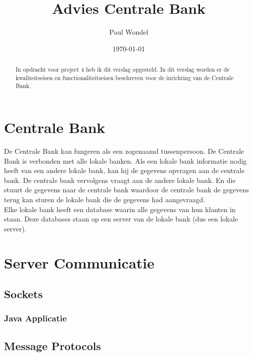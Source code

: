 \documentclass{article}
\begin{document}
\title{Advies Centrale Bank}
\author{Paul Wondel}
\date{\today}
\maketitle

\begin{abstract}
In opdracht voor project 4 heb ik dit verslag opgesteld.
In dit verslag worden er de kwaliteitseisen en functionaliteitseisen
beschreven voor de inrichting van de Centrale Bank.
\end{abstract}

\clearpage
\newpage

\tableofcontents

\clearpage
\newpage

\section{Centrale Bank}
De Centrale Bank kan fungeren als een zogenaamd tussenpersoon.
De Centrale Bank is verbonden met alle lokale banken.
Als een lokale bank informatie nodig heeft van een andere lokale bank,
kan hij de gegevens opvragen aan de centrale bank.
De centrale bank vervolgens vraagt aan de andere lokale bank.
En die stuurt de gegevens naar de centrale bank waardoor de centrale bank
de gegevens terug kan sturen de lokale bank die de gegevens had aangevraagd.\\

Elke lokale bank heeft een database waarin alle gegevens van hun klanten in staan.
Deze databases staan op een server van de lokale bank (dus een lokale server).



\section{Server Communicatie}
 

\subsection{Sockets}

\subsubsection{Java Applicatie}

\subsection{Message Protocols}
\end{document}
